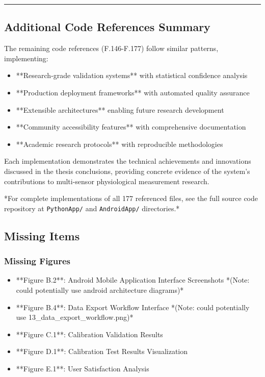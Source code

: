 \documentclass[12pt,a4paper]{article}
\begin{document}
{{\hrule

\subsection{Additional Code References Summary}

The remaining code references (F.146-F.177) follow similar patterns, implementing:

\begin{itemize}
\item **Research-grade validation systems** with statistical confidence analysis
\item **Production deployment frameworks** with automated quality assurance
\item **Extensible architectures** enabling future research development
\item **Community accessibility features** with comprehensive documentation
\item **Academic research protocols** with reproducible methodologies

\end{itemize}
Each implementation demonstrates the technical achievements and innovations discussed in the thesis conclusions,
providing concrete evidence of the system's contributions to multi-sensor physiological measurement research.

*For complete implementations of all 177 referenced files, see the full source code repository at \texttt{PythonApp/}
and \texttt{AndroidApp/} directories.*

\subsection{Missing Items}

\subsubsection{Missing Figures}

\begin{itemize}
\item **Figure B.2**: Android Mobile Application Interface Screenshots *(Note: could potentially use android architecture
  diagrams)*
\item **Figure B.4**: Data Export Workflow Interface *(Note: could potentially use 13_data_export_workflow.png)*
\item **Figure C.1**: Calibration Validation Results
\item **Figure D.1**: Calibration Test Results Visualization
\item **Figure E.1**: User Satisfaction Analysis


\end{itemize}}}
\end{document}

